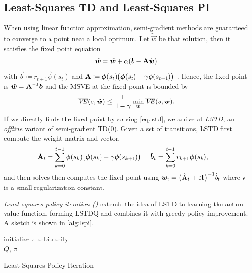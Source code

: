 		\subsection{Least-Squares \acs{TD} and Least-Squares \acs{PI}}
			When using linear function approximation, semi-gradient methods are guaranteed to converge to a point near a local optimum. Let \(\tilde{\vec{w}}\) be that solution, then it satisfies the fixed point equation
			\begin{equation}
				\tilde{\bm{w}} = \tilde{\bm{w}} + \alpha (\bm{b} - \bm{\mathrm{A}} \tilde{\bm{w}})  \label{eq:lstd}
			\end{equation}
			with \( \vec{b} \coloneqq r_{t + 1} \vec{\phi}(s_t) \) and \( \bm{\mathrm{A}} \coloneqq \bm{\phi}(s_t) \bigl( \bm{\phi}(s_t) - \gamma \bm{\phi}(s_{t + 1}) \bigr)^{\!\top\!} \). Hence, the fixed point is \( \tilde{\bm{w}} = \bm{\mathrm{A}}^{-1} \bm{b} \) and the \ac{MSVE} at the fixed point is bounded by
			\begin{equation}
				\overline{\mathit{VE}}(s, \tilde{\bm{w}}) \leq \frac{1}{1 - \gamma} \min_{\bm{w}} \overline{\mathit{VE}}(s, \bm{w}).
			\end{equation}
			If we directly finds the fixed point by solving \eqref{eq:lstd}, we arrive at \emph{\ac{LSTD}}, an \emph{offline} variant of semi-gradient \acs{TD}(\(0\)). Given a set of transitions, \ac{LSTD} first compute the weight matrix and vector,
			\begin{align}
				\hat{\bm{\mathrm{A}}}_t &= \sum_{k = 0}^{t - 1} \bm{\phi}(s_k) \bigl( \bm{\phi}(s_k) - \gamma \bm{\phi}(s_{k + 1}) \bigr)^{\!\top\!} &
				\hat{\bm{b}}_t &= \sum_{k = 0}^{t - 1} r_{k + 1} \bm{\phi}(s_k),
			\end{align}
			and then solves then computes the fixed point using \( \bm{w}_t = \bigl( \hat{\bm{\mathrm{A}}}_t + \varepsilon \bm{\mathrm{I}} \bigr)^{-1} \hat{b}_t \) where \( \epsilon \) is a small regularization constant.

			\emph{Least-squares policy iteration ()} extends the idea of \ac{LSTD} to learning the action-value function, forming \ac{LSTDQ} and combines it with greedy policy improvement. A sketch is shown in \autoref{alg:lspi}.

			\begin{algorithm}  \DontPrintSemicolon
				initialize \(\pi\) arbitrarily \\
				\Return \(Q\), \(\pi\)
				\caption{Least-Squares Policy Iteration}
				\label{alg:lspi}
			\end{algorithm}


